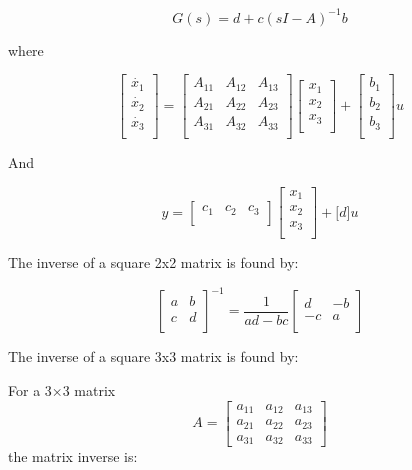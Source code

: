 \begin{multicols}{3}
\[G\left( s \right) = d + c{(sI - A)}^{- 1}b\]


where

\[\begin{bmatrix}
\dot{x_{1}} \\
\dot{x_{2}} \\
\dot{x_{3}} \\
\end{bmatrix} = \begin{bmatrix}
A_{11} & A_{12} & A_{13} \\
A_{21} & A_{22} & A_{23} \\
A_{31} & A_{32} & A_{33} \\
\end{bmatrix}\begin{bmatrix}
x_{1} \\
x_{2} \\
x_{3} \\
\end{bmatrix} + \begin{bmatrix}
b_{1} \\
b_{2} \\
b_{3} \\
\end{bmatrix}u\]

And

\[y = \begin{bmatrix}
c_{1} & c_{2} & c_{3} \\
\end{bmatrix}\begin{bmatrix}
x_{1} \\
x_{2} \\
x_{3} \\
\end{bmatrix} + \lbrack d\rbrack u\]

The inverse of a square 2x2 matrix is found by:

\[\begin{bmatrix}
a & b \\
c & d \\
\end{bmatrix}^{- 1} = \frac{1}{ad - bc}\begin{bmatrix}
d & - b \\
 - c & a \\
\end{bmatrix}\]

The inverse of a square 3x3 matrix is found by:

For a 3×3 matrix
$$A=\begin{bmatrix}
	a_{11} & a_{12}  & a_{13} \\
	a_{21} & a_{22}  & a_{23}\\
	a_{31} & a_{32}  &  a_{33}
\end{bmatrix}$$	
the matrix inverse is:


\end{multicols}
